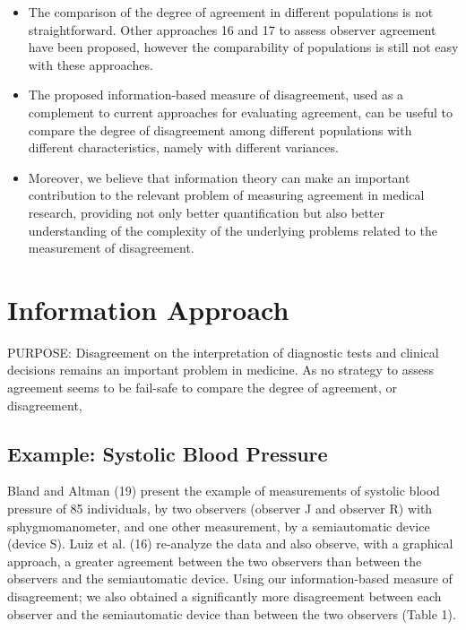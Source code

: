 \documentclass[12pt, a4paper]{report}
\theoremstyle{plain}
\theoremstyle{definition}
\theoremstyle{remark}
\begin{document}
\begin{itemize}
		\item The comparison of the degree of agreement in different populations is not straightforward. Other approaches 16 and 17 to assess observer agreement have been proposed, however the comparability of populations is still not easy with these approaches.
		
		\item The proposed information-based measure of disagreement, used as a complement to current approaches for evaluating agreement, can be useful to compare the degree of disagreement among different populations with different characteristics, namely with different variances.
		
		\item Moreover, we believe that information theory can make an important contribution to the relevant problem of measuring agreement in medical research, providing not only better quantification but also better understanding of the complexity of the underlying problems related to the measurement of disagreement.
	\end{itemize}
	
	\section{Information Approach}
	
	PURPOSE: Disagreement on the interpretation of diagnostic tests and clinical decisions 
	remains an important problem in medicine. As no strategy to assess agreement seems to be 
	fail-safe to compare the degree of agreement, or disagreement, 
	
	
	
	\subsection{Example: Systolic Blood Pressure}
	Bland and Altman (19) present the example of measurements of systolic blood pressure of 85 individuals, by two observers (observer J and observer R) with sphygmomanometer, and one other measurement, by a semiautomatic device (device S). Luiz et al. (16) re-analyze the data and also observe, with a graphical approach, a greater agreement between the two observers than between the observers and the semiautomatic device. Using our information-based measure of disagreement; we also obtained a significantly more
	disagreement between each observer and the semiautomatic device than between the two observers (Table 1).
	
\end{document}
